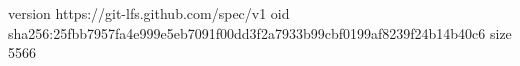 version https://git-lfs.github.com/spec/v1
oid sha256:25fbb7957fa4e999e5eb7091f00dd3f2a7933b99cbf0199af8239f24b14b40c6
size 5566
